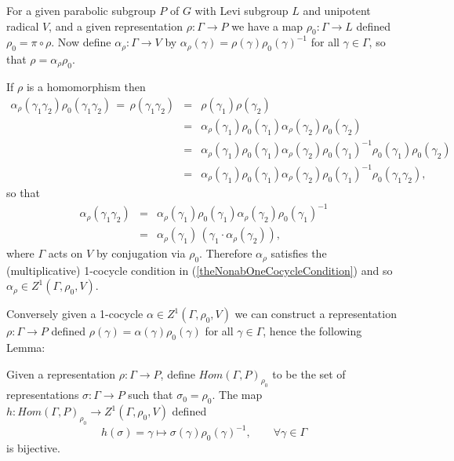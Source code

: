 For a given parabolic subgroup $P$ of $G$ with Levi subgroup $L$ and unipotent radical $V$, and a given representation $\rho:\Gamma\rightarrow P$ we have a map $\rho_0:\Gamma\rightarrow L$ defined $\rho_0 = \pi \circ \rho$. Now define $\alpha_\rho:\Gamma\rightarrow V$ by $\alpha_\rho(\gamma) = \rho(\gamma)\rho_0(\gamma)^{-1}$ for all $\gamma\in\Gamma$, so that $\rho = \alpha_\rho\rho_0$.

If $\rho$ is a homomorphism then
\begin{eqnarray*}
	\alpha_\rho(\gamma_1\gamma_2)\rho_0(\gamma_1\gamma_2) \,=\, \rho(\gamma_1\gamma_2) 
		&=& \rho(\gamma_1)\rho(\gamma_2) \\
		&=& \alpha_\rho(\gamma_1)\rho_0(\gamma_1)\alpha_\rho(\gamma_2)\rho_0(\gamma_2) \\
		&=& \alpha_\rho(\gamma_1)\rho_0(\gamma_1)\alpha_\rho(\gamma_2)\rho_0(\gamma_1)^{-1}\rho_0(\gamma_1)\rho_0(\gamma_2)\\
		&=&\alpha_\rho(\gamma_1)\rho_0(\gamma_1)\alpha_\rho(\gamma_2)\rho_0(\gamma_1)^{-1}\rho_0(\gamma_1\gamma_2),
\end{eqnarray*}
so that
\begin{eqnarray*}
	\alpha_\rho(\gamma_1\gamma_2) &=&
	\alpha_\rho(\gamma_1)\rho_0(\gamma_1)\alpha_\rho(\gamma_2)\rho_0(\gamma_1)^{-1}\\
	&=& \alpha_\rho(\gamma_1)\,\left(\gamma_1\cdot\alpha_\rho(\gamma_2)\right),
\end{eqnarray*}
where $\Gamma$ acts on $V$ by conjugation via $\rho_0$. Therefore $\alpha_\rho$ satisfies the (multiplicative) 1-cocycle condition in (\ref{theNonabOneCocycleCondition}) and so $\alpha_\rho\in Z^1(\Gamma, \rho_0, V)$. 

Conversely given a 1-cocycle $\alpha\in Z^1(\Gamma, \rho_0, V)$ we can construct a representation $\rho:\Gamma\rightarrow P$ defined $\rho(\gamma) = \alpha(\gamma)\rho_0(\gamma)$ for all $\gamma\in \Gamma$, hence the following Lemma:

\begin{lemma}\label{bijCor} Given a representation $\rho:\Gamma\rightarrow P$, define $Hom(\Gamma, P)_{\rho_0}$ to be the set of representations $\sigma:\Gamma\rightarrow P$ such that $\sigma_0 = \rho_0$. The map $h:Hom(\Gamma, P)_{\rho_0} \rightarrow Z^1(\Gamma, \rho_0, V)$ defined
\begin{displaymath}
	h(\sigma) = \gamma \mapsto \sigma(\gamma)\rho_0(\gamma)^{-1},\qquad \forall \gamma\in\Gamma
\end{displaymath}
is bijective.
\end{lemma}

